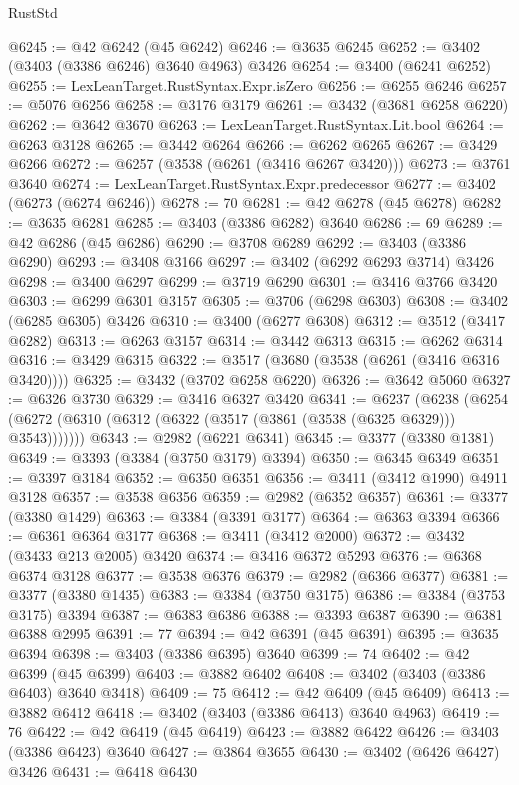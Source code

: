 \begin{lexlean}{RustStd}
\begin{coremodule}
@6245 := @42 @6242 (@45 @6242)
@6246 := @3635 @6245
@6252 := @3402 (@3403 (@3386 @6246) @3640 @4963) @3426
@6254 := @3400 (@6241 @6252)
@6255 := LexLeanTarget.RustSyntax.Expr.isZero
@6256 := @6255 @6246
@6257 := @5076 @6256
@6258 := @3176 @3179
@6261 := @3432 (@3681 @6258 @6220)
@6262 := @3642 @3670
@6263 := LexLeanTarget.RustSyntax.Lit.bool
@6264 := @6263 @3128
@6265 := @3442 @6264
@6266 := @6262 @6265
@6267 := @3429 @6266
@6272 := @6257 (@3538 (@6261 (@3416 @6267 @3420)))
@6273 := @3761 @3640
@6274 := LexLeanTarget.RustSyntax.Expr.predecessor
@6277 := @3402 (@6273 (@6274 @6246))
@6278 := 70
@6281 := @42 @6278 (@45 @6278)
@6282 := @3635 @6281
@6285 := @3403 (@3386 @6282) @3640
@6286 := 69
@6289 := @42 @6286 (@45 @6286)
@6290 := @3708 @6289
@6292 := @3403 (@3386 @6290)
@6293 := @3408 @3166
@6297 := @3402 (@6292 @6293 @3714) @3426
@6298 := @3400 @6297
@6299 := @3719 @6290
@6301 := @3416 @3766 @3420
@6303 := @6299 @6301 @3157
@6305 := @3706 (@6298 @6303)
@6308 := @3402 (@6285 @6305) @3426
@6310 := @3400 (@6277 @6308)
@6312 := @3512 (@3417 @6282)
@6313 := @6263 @3157
@6314 := @3442 @6313
@6315 := @6262 @6314
@6316 := @3429 @6315
@6322 := @3517 (@3680 (@3538 (@6261 (@3416 @6316 @3420))))
@6325 := @3432 (@3702 @6258 @6220)
@6326 := @3642 @5060
@6327 := @6326 @3730
@6329 := @3416 @6327 @3420
@6341 := @6237
    (@6238 (@6254 (@6272 (@6310 (@6312 (@6322 (@3517 (@3861 (@3538 (@6325 @6329))) @3543)))))))
@6343 := @2982 (@6221 @6341)
@6345 := @3377 (@3380 @1381)
@6349 := @3393 (@3384 (@3750 @3179) @3394)
@6350 := @6345 @6349
@6351 := @3397 @3184
@6352 := @6350 @6351
@6356 := @3411 (@3412 @1990) @4911 @3128
@6357 := @3538 @6356
@6359 := @2982 (@6352 @6357)
@6361 := @3377 (@3380 @1429)
@6363 := @3384 (@3391 @3177)
@6364 := @6363 @3394
@6366 := @6361 @6364 @3177
@6368 := @3411 (@3412 @2000)
@6372 := @3432 (@3433 @213 @2005) @3420
@6374 := @3416 @6372 @5293
@6376 := @6368 @6374 @3128
@6377 := @3538 @6376
@6379 := @2982 (@6366 @6377)
@6381 := @3377 (@3380 @1435)
@6383 := @3384 (@3750 @3175)
@6386 := @3384 (@3753 @3175) @3394
@6387 := @6383 @6386
@6388 := @3393 @6387
@6390 := @6381 @6388 @2995
@6391 := 77
@6394 := @42 @6391 (@45 @6391)
@6395 := @3635 @6394
@6398 := @3403 (@3386 @6395) @3640
@6399 := 74
@6402 := @42 @6399 (@45 @6399)
@6403 := @3882 @6402
@6408 := @3402 (@3403 (@3386 @6403) @3640 @3418)
@6409 := 75
@6412 := @42 @6409 (@45 @6409)
@6413 := @3882 @6412
@6418 := @3402 (@3403 (@3386 @6413) @3640 @4963)
@6419 := 76
@6422 := @42 @6419 (@45 @6419)
@6423 := @3882 @6422
@6426 := @3403 (@3386 @6423) @3640
@6427 := @3864 @3655
@6430 := @3402 (@6426 @6427) @3426
@6431 := @6418 @6430

\end{coremodule}
\end{lexlean}
